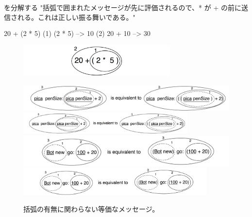 \documentclass[a4paper,10pt,twoside]{book}
\begin{document}
\begin{example}[mathcorrect]{ を分解する}{}
"括弧で囲まれたメッセージが先に評価されるので、* が + の前に送信される。これは正しい振る舞いである。"

    20 + (2 * 5)
(1)        (2 * 5) --> 10
(2) 20 + 10      --> 30
\end{example}

\begin{figure}
\begin{center}
\includegraphics[width=8cm]{ucompoNumberBracket}
\end{center}
\end{figure}



\begin{figure}
\begin{center}
\ifluluelse
	{\includegraphics[width=\textwidth]{uKeyUnBinPar}}
	{\includegraphics[width=0.8\textwidth]{uKeyUnBinPar}}
\ifluluelse
	{\includegraphics[width=\textwidth]{uunKeyBinPar}}
	{\includegraphics[width=10cm]{uunKeyBinPar}}
\end{center}
\caption{括弧の有無に関わらない等価なメッセージ。}
\end{figure}
\end{document}
